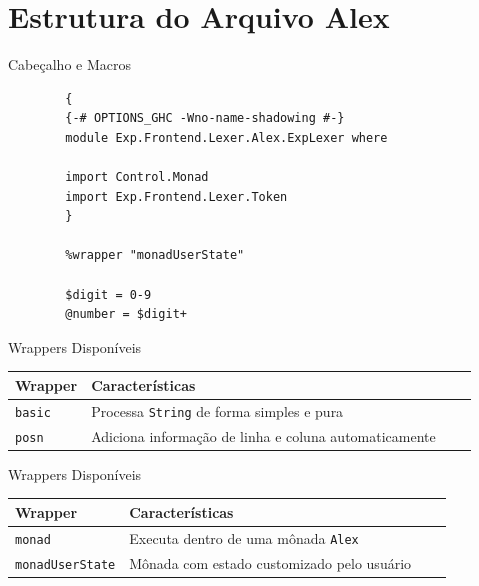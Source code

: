 \section{Estrutura do Arquivo Alex}\label{estrutura-do-arquivo-alex}

\begin{frame}[fragile]{Cabeçalho e Macros}

    \begin{lstlisting}
        {
        {-# OPTIONS_GHC -Wno-name-shadowing #-}
        module Exp.Frontend.Lexer.Alex.ExpLexer where

        import Control.Monad
        import Exp.Frontend.Lexer.Token
        }

        %wrapper "monadUserState"

        $digit = 0-9
        @number = $digit+
    \end{lstlisting}
\end{frame}

\begin{frame}[fragile]{Wrappers Disponíveis}

    \begin{table}
        \begin{tabular}{l l l l}
            \hline
            Wrapper & Características \\
            \hline
            \texttt{basic} & Processa
            \texttt{String} de forma simples e pura \\
            \texttt{posn} & Adiciona informação de linha e coluna
            automaticamente \\
            \hline
        \end{tabular}
    \end{table}
\end{frame}

\begin{frame}[fragile]{Wrappers Disponíveis}

    \begin{table}
        \begin{tabular}{l l l l}
            \hline
            Wrapper & Características \\
            \hline
            \texttt{monad} & Executa dentro de uma mônada
            \texttt{Alex} \\
            \texttt{monadUserState} & Mônada com estado customizado
            pelo usuário \\
            \hline
        \end{tabular}
    \end{table}
\end{frame}

